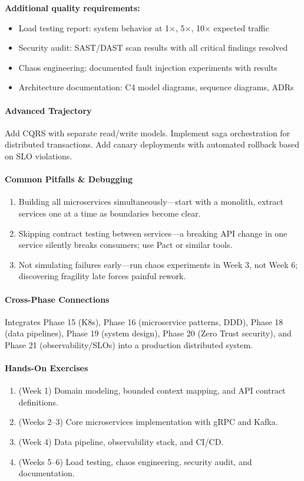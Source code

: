 \documentclass[11pt, a4paper, oneside]{report}
\begin{document}
\textbf{Additional quality requirements:}
\begin{itemize}[leftmargin=*]
\item Load testing report: system behavior at 1$\times$, 5$\times$, 10$\times$ expected traffic
\item Security audit: SAST/DAST scan results with all critical findings resolved
\item Chaos engineering: documented fault injection experiments with results
\item Architecture documentation: C4 model diagrams, sequence diagrams, ADRs
\end{itemize}

\paragraph{Advanced Trajectory} Add CQRS with separate read/write models. Implement saga orchestration for distributed transactions. Add canary deployments with automated rollback based on SLO violations.

\paragraph{Common Pitfalls \& Debugging}
\begin{enumerate}[leftmargin=*]
\item Building all microservices simultaneously---start with a monolith, extract services one at a time as boundaries become clear.
\item Skipping contract testing between services---a breaking API change in one service silently breaks consumers; use Pact or similar tools.
\item Not simulating failures early---run chaos experiments in Week 3, not Week 6; discovering fragility late forces painful rework.
\end{enumerate}

\paragraph{Cross-Phase Connections} Integrates Phase 15 (K8s), Phase 16 (microservice patterns, DDD), Phase 18 (data pipelines), Phase 19 (system design), Phase 20 (Zero Trust security), and Phase 21 (observability/SLOs) into a production distributed system.

\paragraph{Hands-On Exercises}
\begin{enumerate}[leftmargin=*]
\item (Week 1) Domain modeling, bounded context mapping, and API contract definitions.
\item (Weeks 2--3) Core microservices implementation with gRPC and Kafka.
\item (Week 4) Data pipeline, observability stack, and CI/CD.
\item (Weeks 5--6) Load testing, chaos engineering, security audit, and documentation.
\end{enumerate}
\end{document}
